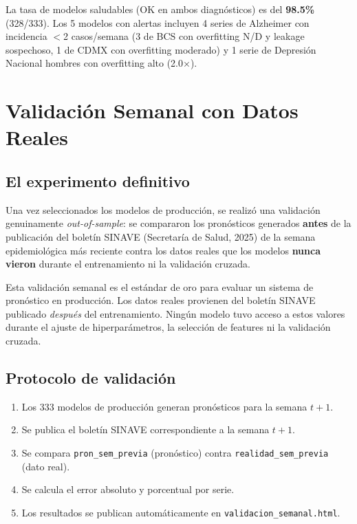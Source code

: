 \documentclass[12pt, letterpaper]{article}
\begin{document}
\begin{insightbox}
La tasa de modelos saludables (OK en ambos diagnósticos) es del \textbf{98.5\%} (328/333). Los 5 modelos con alertas incluyen 4 series de Alzheimer con incidencia $<$2 casos/semana (3 de BCS con overfitting N/D y leakage sospechoso, 1 de CDMX con overfitting moderado) y 1 serie de Depresión Nacional hombres con overfitting alto (2.0$\times$).
\end{insightbox}

\newpage
\section{Validación Semanal con Datos Reales}\label{sec:validacion}

\subsection{El experimento definitivo}

Una vez seleccionados los modelos de producción, se realizó una validación genuinamente \textit{out-of-sample}: se compararon los pronósticos generados \textbf{antes} de la publicación del boletín SINAVE (Secretaría de Salud, 2025) de la semana epidemiológica más reciente contra los datos reales que los modelos \textbf{nunca vieron} durante el entrenamiento ni la validación cruzada.

\begin{insightbox}
Esta validación semanal es el estándar de oro para evaluar un sistema de pronóstico en producción. Los datos reales provienen del boletín SINAVE publicado \textit{después} del entrenamiento. Ningún modelo tuvo acceso a estos valores durante el ajuste de hiperparámetros, la selección de features ni la validación cruzada.
\end{insightbox}

\subsection{Protocolo de validación}

\begin{enumerate}[noitemsep]
    \item Los 333 modelos de producción generan pronósticos para la semana $t+1$.
    \item Se publica el boletín SINAVE correspondiente a la semana $t+1$.
    \item Se compara \texttt{pron\_sem\_previa} (pronóstico) contra \texttt{realidad\_sem\_previa} (dato real).
    \item Se calcula el error absoluto y porcentual por serie.
    \item Los resultados se publican automáticamente en \texttt{validacion\_semanal.html}.
\end{enumerate}
\end{document}
